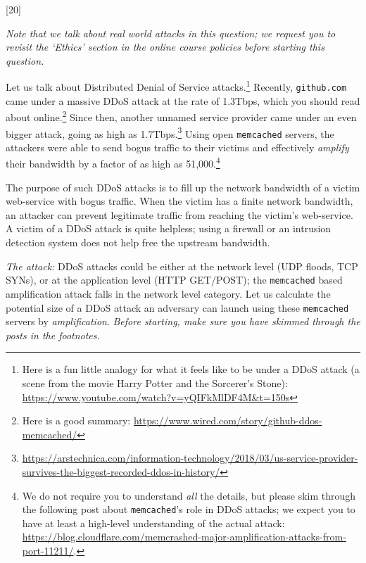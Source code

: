 \documentclass[12pt]{exam}
\begin{document}
\begin{Form}
\begin{questions}
\newpage
{}[20] 

\textit{Note that we talk about real world attacks in this question; we request
  you to revisit the `Ethics' section in the online course policies before 
  starting this question.}

Let us talk about Distributed Denial of Service attacks.\footnote{Here is a fun
little analogy for what it feels like to be under a DDoS attack (a scene from
the movie Harry Potter and the Sorcerer's Stone):
\href{https://www.youtube.com/watch?v=yQIFkMlDF4M\&t=150s}{https://www.youtube.com/watch?v=yQIFkMlDF4M\&t=150s}}
Recently, \texttt{github.com} came under a massive DDoS attack at the rate of
1.3Tbps, which you should read about online.\footnote{Here is a good summary:
\href{https://www.wired.com/story/github-ddos-memcached/}{https://www.wired.com/story/github-ddos-memcached/}}
Since then, another unnamed service provider came under an even bigger
attack, going as high as
1.7Tbps.\footnote{\href{https://arstechnica.com/information-technology/2018/03/us-service-provider-survives-the-biggest-recorded-ddos-in-history/}{https://arstechnica.com/information-technology/2018/03/us-service-provider-survives-the-biggest-recorded-ddos-in-history/}}
Using open \texttt{memcached} servers, the attackers were able to send bogus
traffic to their victims and effectively \emph{amplify} their bandwidth by a
factor of as high as 51,000.\footnote{ We do not require you to understand
\emph{all} the details, but please skim through the following post about
\texttt{memcached}'s role in DDoS attacks; we expect you to have at least a
high-level understanding of the actual attack:
\href{https://blog.cloudflare.com/memcrashed-major-amplification-attacks-from-port-11211/}{https://blog.cloudflare.com/memcrashed-major-amplification-attacks-from-port-11211/}.

}

The purpose of such DDoS attacks is to fill up the network bandwidth of a victim
web-service with bogus traffic. When the victim has a finite network bandwidth,
an attacker can prevent legitimate traffic from reaching the victim's
web-service. A victim of a DDoS attack is quite helpless; using a firewall or an intrusion detection system does not help free the upstream bandwidth.

\textit{The attack:} DDoS attacks could be either at the network level (UDP
floods, TCP SYNs), or at the application level (HTTP GET/POST); the
\texttt{memcached} based amplification attack falls in the network level
category. Let us calculate the potential size of a DDoS attack an adversary can
launch using these \texttt{memcached} servers by \emph{amplification}.
\emph{Before starting, make sure you have skimmed through the posts in the
footnotes.}



\end{questions}
\end{Form}
\end{document}
